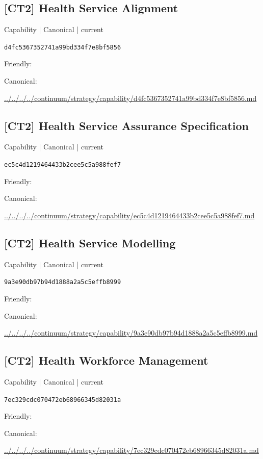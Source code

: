 \documentclass[10pt,a4paper]{article}
\begin{document}
\subsection*{[CT2] Health Service Alignment}
{\small Capability | Canonical | current}\par
\texttt{d4fc5367352741a99bd334f7e8bf5856}\par
Friendly: \par
Canonical: \par
{\footnotesize\url{../../../../continuum/strategy/capability/d4fc5367352741a99bd334f7e8bf5856.md}}\par
\subsection*{[CT2] Health Service Assurance Specification}
{\small Capability | Canonical | current}\par
\texttt{ec5c4d1219464433b2cee5c5a988fef7}\par
Friendly: \par
Canonical: \par
{\footnotesize\url{../../../../continuum/strategy/capability/ec5c4d1219464433b2cee5c5a988fef7.md}}\par
\subsection*{[CT2] Health Service Modelling}
{\small Capability | Canonical | current}\par
\texttt{9a3e90db97b94d1888a2a5c5effb8999}\par
Friendly: \par
Canonical: \par
{\footnotesize\url{../../../../continuum/strategy/capability/9a3e90db97b94d1888a2a5c5effb8999.md}}\par
\subsection*{[CT2] Health Workforce Management}
{\small Capability | Canonical | current}\par
\texttt{7ec329cdc070472eb68966345d82031a}\par
Friendly: \par
Canonical: \par
{\footnotesize\url{../../../../continuum/strategy/capability/7ec329cdc070472eb68966345d82031a.md}}\par
\end{document}

